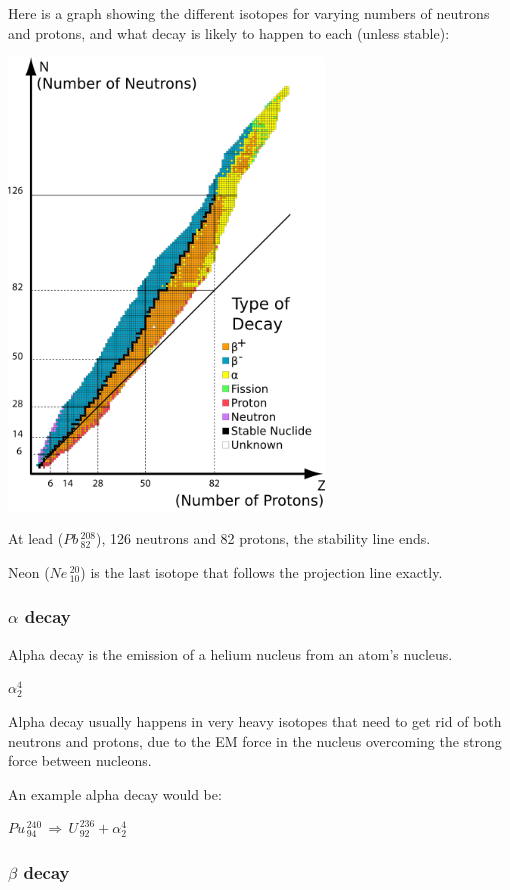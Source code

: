 \documentclass[a4paper, 12pt]{article}
\begin{document}
Here is a graph showing the different isotopes for varying numbers of neutrons and protons, and what decay is likely to happen to each (unless stable):

\begin{center}
\includegraphics[height=12cm]{images/bandOfStability.png}
\end{center}

At lead ($Pb\, ^{208}_{82}$), 126 neutrons and 82 protons, the stability line ends.

Neon ($Ne\, ^{20}_{10}$) is the last isotope that follows the projection line exactly.

\subsubsection{{$\alpha$} decay}

Alpha decay is the emission of a helium nucleus from an atom's nucleus.

${\alpha^4_2}$

Alpha decay usually happens in very heavy isotopes that need to get rid of both neutrons and protons, due to the EM force in the nucleus overcoming the strong force between nucleons.

An example alpha decay would be:

$Pu^{\,240}_{\,94}\, {\Rightarrow}\, U^{\,236}_{\,92} + \alpha^4_2$

\subsubsection{{$\beta$} decay}
\end{document}
